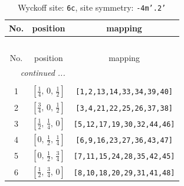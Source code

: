 \documentclass[fleqn,8pt]{jsarticle}
\begin{document}
\renewcommand{\arraystretch}{1.2}
\begin{longtable}{ccc}
\caption{Wyckoff site: {\tt 6c}, site symmetry: {\tt -4m'.2'}}
 \\
 \hline \hline
No. & position & mapping \\ \hline \endfirsthead

\multicolumn{2}{l}{\tablename\ \thetable{}} \\
 \hline \hline
No. & position & mapping \\ \hline \endhead

 \hline \hline
\multicolumn{2}{r}{\footnotesize\it continued ...} \\ \endfoot

 \hline \hline
\multicolumn{2}{r}{} \\ \endlastfoot

1 & $\left[ \frac{1}{4},\, 0,\, \frac{1}{2} \right]$ & {\tt [1,2,13,14,33,34,39,40]} \\ \hline
2 & $\left[ \frac{3}{4},\, 0,\, \frac{1}{2} \right]$ & {\tt [3,4,21,22,25,26,37,38]} \\ \hline
3 & $\left[ \frac{1}{2},\, \frac{1}{4},\, 0 \right]$ & {\tt [5,12,17,19,30,32,44,46]} \\ \hline
4 & $\left[ 0,\, \frac{1}{2},\, \frac{1}{4} \right]$ & {\tt [6,9,16,23,27,36,43,47]} \\ \hline
5 & $\left[ 0,\, \frac{1}{2},\, \frac{3}{4} \right]$ & {\tt [7,11,15,24,28,35,42,45]} \\ \hline
6 & $\left[ \frac{1}{2},\, \frac{3}{4},\, 0 \right]$ & {\tt [8,10,18,20,29,31,41,48]} \\
\end{longtable}
\renewcommand{\arraystretch}{1.2}
\end{document}
